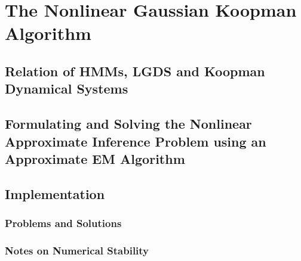 \chapter{The Nonlinear Gaussian Koopman Algorithm}  %
\label{c:nonlinearGaussianKoopman}




\section{Relation of HMMs, LGDS and Koopman Dynamical Systems}


\section{Formulating and Solving the Nonlinear Approximate Inference Problem using an Approximate EM Algorithm}


\section{Implementation}


	\subsection{Problems and Solutions}

	\subsection{Notes on Numerical Stability}
